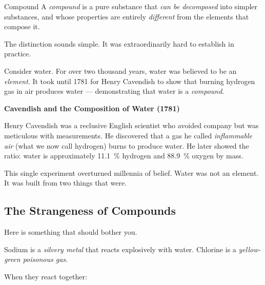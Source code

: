 \documentclass[12pt, a4paper]{book}
\theoremstyle{definition}
\newcommand{\newterm}[1]{\textit{\textcolor{DiscoveryColor}{#1}}}
\begin{document}
\vspace{0.5em}

\begin{namedconcept}{Compound}
A \newterm{compound} is a pure substance that \emph{can be decomposed}
into simpler substances, and whose properties are entirely
\emph{different} from the elements that compose it.
\end{namedconcept}

\vspace{0.5em}

The distinction sounds simple. It was extraordinarily hard to establish in practice. 

Consider water.
For over two thousand years, water was believed to be an \emph{element}.
It took until 1781 for Henry Cavendish to show that burning hydrogen
gas in air produces water — demonstrating that water is a \emph{compound}.

\begin{historybox}
\textbf{Cavendish and the Composition of Water (1781)}

Henry Cavendish was a reclusive English scientist who avoided
company but was meticulous with measurements.
He discovered that a gas he called \emph{inflammable air}
(what we now call hydrogen) burns to produce water.
He later showed the ratio: water is approximately
\SI{11.1}{\percent} hydrogen and \SI{88.9}{\percent} oxygen by mass.

This single experiment overturned millennia of belief.
Water was not an element.
It was built from two things that were.

\begin{center}
\end{center}
\end{historybox}

\subsection{The Strangeness of Compounds}

Here is something that should bother you.

Sodium is a \emph{silvery metal} that reacts explosively with water.
Chlorine is a \emph{yellow-green poisonous gas}.

When they react together:

\vspace{0.3em}
\begin{center}
\end{center}
\vspace{0.3em}
\end{document}
